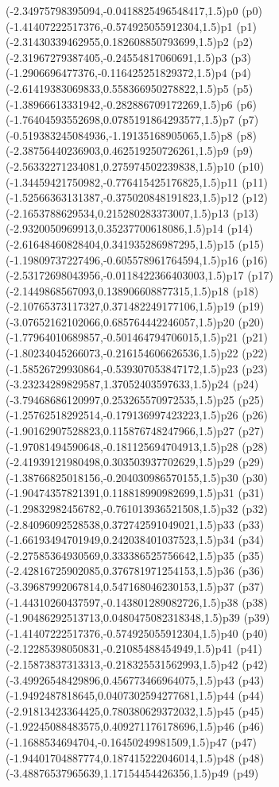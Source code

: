 \psPoint(-2.34975798395094,-0.0418825496548417,1.5){p0}
\psdot(p0)
\psPoint(-1.41407222517376,-0.574925055912304,1.5){p1}
\psdot(p1)
\psPoint(-2.31430339462955,0.182608850793699,1.5){p2}
\psdot(p2)
\psPoint(-2.31967279387405,-0.24554817060691,1.5){p3}
\psdot(p3)
\psPoint(-1.2906696477376,-0.116425251829372,1.5){p4}
\psdot(p4)
\psPoint(-2.61419383069833,0.558366950278822,1.5){p5}
\psdot(p5)
\psPoint(-1.38966613331942,-0.282886709172269,1.5){p6}
\psdot(p6)
\psPoint(-1.76404593552698,0.0785191864293577,1.5){p7}
\psdot(p7)
\psPoint(-0.519383245084936,-1.19135168905065,1.5){p8}
\psdot(p8)
\psPoint(-2.38756440236903,0.462519250726261,1.5){p9}
\psdot(p9)
\psPoint(-2.56332271234081,0.275974502239838,1.5){p10}
\psdot(p10)
\psPoint(-1.34459421750982,-0.776415425176825,1.5){p11}
\psdot(p11)
\psPoint(-1.52566363131387,-0.375020848191823,1.5){p12}
\psdot(p12)
\psPoint(-2.1653788629534,0.215280283373007,1.5){p13}
\psdot(p13)
\psPoint(-2.9320050969913,0.35237700618086,1.5){p14}
\psdot(p14)
\psPoint(-2.61648460828404,0.341935286987295,1.5){p15}
\psdot(p15)
\psPoint(-1.19809737227496,-0.605578961764594,1.5){p16}
\psdot(p16)
\psPoint(-2.53172698043956,-0.0118422366403003,1.5){p17}
\psdot(p17)
\psPoint(-2.1449868567093,0.138906608877315,1.5){p18}
\psdot(p18)
\psPoint(-2.10765373117327,0.371482249177106,1.5){p19}
\psdot(p19)
\psPoint(-3.07652162102066,0.685764442246057,1.5){p20}
\psdot(p20)
\psPoint(-1.77964010689857,-0.501464794706015,1.5){p21}
\psdot(p21)
\psPoint(-1.80234045266073,-0.216154606626536,1.5){p22}
\psdot(p22)
\psPoint(-1.58526729930864,-0.539307053847172,1.5){p23}
\psdot(p23)
\psPoint(-3.23234289829587,1.37052403597633,1.5){p24}
\psdot(p24)
\psPoint(-3.79468686120997,0.253265570972535,1.5){p25}
\psdot(p25)
\psPoint(-1.25762518292514,-0.179136997423223,1.5){p26}
\psdot(p26)
\psPoint(-1.90162907528823,0.115876748247966,1.5){p27}
\psdot(p27)
\psPoint(-1.97081494590648,-0.181125694704913,1.5){p28}
\psdot(p28)
\psPoint(-2.41939121980498,0.303503937702629,1.5){p29}
\psdot(p29)
\psPoint(-1.38766825018156,-0.204030986570155,1.5){p30}
\psdot(p30)
\psPoint(-1.90474357821391,0.118818990982699,1.5){p31}
\psdot(p31)
\psPoint(-1.29832982456782,-0.761013936521508,1.5){p32}
\psdot(p32)
\psPoint(-2.84096092528538,0.372742591049021,1.5){p33}
\psdot(p33)
\psPoint(-1.66193494701949,0.242038401037523,1.5){p34}
\psdot(p34)
\psPoint(-2.27585364930569,0.333386525756642,1.5){p35}
\psdot(p35)
\psPoint(-2.42816725902085,0.376781971254153,1.5){p36}
\psdot(p36)
\psPoint(-3.39687992067814,0.547168046230153,1.5){p37}
\psdot(p37)
\psPoint(-1.44310260437597,-0.143801289082726,1.5){p38}
\psdot(p38)
\psPoint(-1.90486292513713,0.0480475082318348,1.5){p39}
\psdot(p39)
\psPoint(-1.41407222517376,-0.574925055912304,1.5){p40}
\psdot(p40)
\psPoint(-2.12285398050831,-0.21085488454949,1.5){p41}
\psdot(p41)
\psPoint(-2.15873837313313,-0.218325531562993,1.5){p42}
\psdot(p42)
\psPoint(-3.49926548429896,0.456773466964075,1.5){p43}
\psdot(p43)
\psPoint(-1.9492487818645,0.0407302594277681,1.5){p44}
\psdot(p44)
\psPoint(-2.91813423364425,0.780380629372032,1.5){p45}
\psdot(p45)
\psPoint(-1.92245088483575,0.409271176178696,1.5){p46}
\psdot(p46)
\psPoint(-1.1688534694704,-0.16450249981509,1.5){p47}
\psdot(p47)
\psPoint(-1.94401704887774,0.187415222046014,1.5){p48}
\psdot(p48)
\psPoint(-3.48876537965639,1.17154454426356,1.5){p49}
\psdot(p49)
